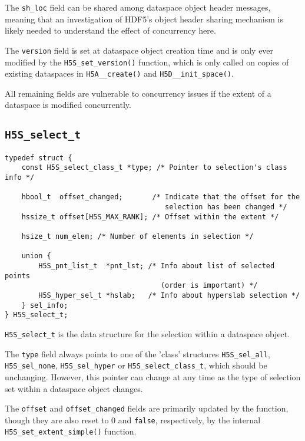 \documentclass[../HDF5_RFC.tex]{subfiles}
\begin{document}
The \texttt{sh\_loc} field can be shared among dataspace object header messages,
meaning that an investigation of HDF5's object header sharing mechanism is likely
needed to understand the effect of concurrency here.

The \texttt{version} field is set at dataspace object creation time and is only
ever modified by the \texttt{H5S\_set\_version()} function, which is only called
on copies of existing dataspaces in \texttt{H5A\_\_create()} and
\texttt{H5D\_\_init\_space()}.

All remaining fields are vulnerable to concurrency issues if the extent of a dataspace
is modified concurrently.

\subsection{\texttt{H5S\_select\_t}}
\label{apdx:h5s_struct_h5s_select_t}

\begin{verbatim}
typedef struct {
    const H5S_select_class_t *type; /* Pointer to selection's class info */

    hbool_t  offset_changed;       /* Indicate that the offset for the
                                      selection has been changed */
    hssize_t offset[H5S_MAX_RANK]; /* Offset within the extent */

    hsize_t num_elem; /* Number of elements in selection */

    union {
        H5S_pnt_list_t  *pnt_lst; /* Info about list of selected points
                                     (order is important) */
        H5S_hyper_sel_t *hslab;   /* Info about hyperslab selection */
    } sel_info;
} H5S_select_t;
\end{verbatim}

\texttt{H5S\_select\_t} is the data structure for the selection within a dataspace
object.

The \texttt{type} field always points to one of the 'class' structures \texttt{H5S\_sel\_all},
\texttt{H5S\_sel\_none}, \texttt{H5S\_sel\_hyper} or \texttt{H5S\_select\_class\_t}, which
should be unchanging. However, this pointer can change at any time as the type of selection
set within a dataspace object changes.

The \texttt{offset} and \texttt{offset\_changed} fields are primarily updated by
the  function, though they are also reset to 0
and \texttt{false}, respectively, by the internal \texttt{H5S\_set\_extent\_simple()}
function.
\end{document}
